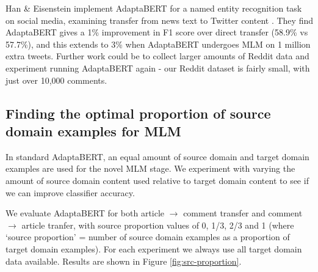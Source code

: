 Han \& Eisenstein implement AdaptaBERT for a named entity recognition task on social media, examining transfer from news text to Twitter content \cite{adaptabert}. They find AdaptaBERT gives a 1\% improvement in F1 score over direct transfer (58.9\% vs 57.7\%), and this extends to 3\% when AdaptaBERT undergoes MLM on 1 million extra tweets. Further work could be to collect larger amounts of Reddit data and experiment running AdaptaBERT again - our Reddit dataset is fairly small, with just over 10,000 comments.

\subsection{Finding the optimal proportion of source domain examples for MLM} \label{subsec:src-proportion-adaptabert}

In standard AdaptaBERT, an equal amount of source domain and target domain examples are used for the novel MLM stage. We experiment with varying the amount of source domain content used relative to target domain content to see if we can improve classifier accuracy.

We evaluate AdaptaBERT for both article $ \rightarrow $ comment transfer and comment $ \rightarrow $ article tranfer, with source proportion values of 0, 1/3, 2/3 and 1 (where `source proportion' = number of source domain examples as a proportion of target domain examples). For each experiment we always use all target domain data available. Results are shown in Figure \ref{fig:src-proportion}.

